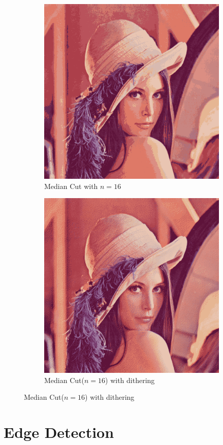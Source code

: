 \documentclass{article}
\begin{document}
\begin{figure}[!ht]
\begin{subfigure}{.5\textwidth}
\centering
\includegraphics[width=.75\linewidth]{img1_2_16.png}
\caption{Median Cut with $n = 16$}
\end{subfigure}
\begin{subfigure}{.5\textwidth}
\centering
\includegraphics[width=.75\linewidth]{img1_3_16.png}
\caption{Median Cut($n = 16$) with dithering}
\end{subfigure}
\end{figure}

\clearpage

\section{Edge Detection}
\end{document}

